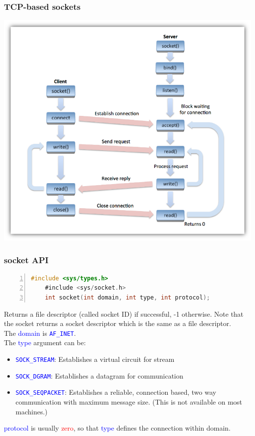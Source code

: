 \documentclass[12pt]{beamer}
\begin{document}
\begin{frame}
	\frametitle{TCP-based sockets}
	\begin{center}
		\includegraphics[scale=.65]{images/Socket-Workflow.png} 
	\end{center}
\end{frame}

\begin{frame}[fragile]
	\frametitle{socket API}
	{\tiny
	\begin{lstlisting}[language=C, breaklines=true, commentstyle=\color{mygreen},frame=lrtb,  rulecolor=\color{black}, numbers=left,  numbersep=5pt, numberstyle=\tiny\color{mygray}]
	#include <sys/types.h>
	#include <sys/socket.h>
	int socket(int domain, int type, int protocol);
	\end{lstlisting}}
	{\footnotesize
	Returns a file descriptor (called socket ID) if successful, -1 otherwise. Note that the socket returns a socket descriptor which is the same as a file descriptor. \\
	The \textcolor{blue}{domain} is \textcolor{blue}{\texttt{AF\_INET}}. \\
	The \textcolor{blue}{type} argument can be: \\
	\begin{itemize}
		\item \textcolor{blue}{\texttt{SOCK\_STREAM}}: Establishes a virtual circuit for stream
		\item \textcolor{blue}{\texttt{SOCK\_DGRAM}}: Establishes a datagram for communication 
		\item \textcolor{blue}{\texttt{SOCK\_SEQPACKET}}:  Establishes a reliable, connection based,
two way communication with maximum message size. (This is not available on most machines.)
	\end{itemize}
	\textcolor{blue}{protocol} is usually \textcolor{red}{zero}, so that \textcolor{blue}{type} defines the connection 	within domain.
	}
\end{frame}
\end{document}
